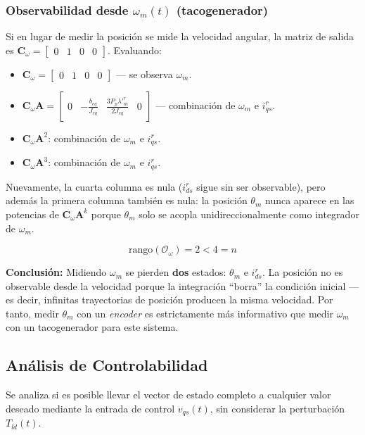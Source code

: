 \documentclass[12pt, a4paper,journal, onecolumn, compsoc]{IEEEtran}
\begin{document}
\subsubsection{Observabilidad desde \texorpdfstring{$\omega_m(t)$}{omega_m(t)} (tacogenerador)}
Si en lugar de medir la posición se mide la velocidad angular, la matriz de salida es $\mathbf{C}_\omega = \begin{bmatrix} 0 & 1 & 0 & 0 \end{bmatrix}$. Evaluando:
\begin{itemize}
    \item $\mathbf{C}_\omega = \begin{bmatrix} 0 & 1 & 0 & 0 \end{bmatrix}$ --- se observa $\omega_m$.
    \item $\mathbf{C}_\omega\mathbf{A} = \begin{bmatrix} 0 & -\frac{b_{eq}}{J_{eq}} & \frac{3P_p\lambda'^r_m}{2J_{eq}} & 0 \end{bmatrix}$ --- combinación de $\omega_m$ e $i_{qs}^r$.
    \item $\mathbf{C}_\omega\mathbf{A}^2$: combinación de $\omega_m$ e $i_{qs}^r$.
    \item $\mathbf{C}_\omega\mathbf{A}^3$: combinación de $\omega_m$ e $i_{qs}^r$.
\end{itemize}

Nuevamente, la cuarta columna es nula ($i_{ds}^r$ sigue sin ser observable), pero además la primera columna también es nula: la posición $\theta_m$ nunca aparece en las potencias de $\mathbf{C}_\omega\mathbf{A}^k$ porque $\theta_m$ solo se acopla unidireccionalmente como integrador de $\omega_m$.

\begin{equation}
    \text{rango}(\mathcal{O}_\omega) = 2 < 4 = n
\end{equation}

\textbf{Conclusión:} Midiendo $\omega_m$ se pierden \textbf{dos} estados: $\theta_m$ e $i_{ds}^r$. La posición no es observable desde la velocidad porque la integración ``borra'' la condición inicial ---es decir, infinitas trayectorias de posición producen la misma velocidad. Por tanto, medir $\theta_m$ con un \textit{encoder} es estrictamente más informativo que medir $\omega_m$ con un tacogenerador para este sistema.

\subsection{Análisis de Controlabilidad}
Se analiza si es posible llevar el vector de estado completo a cualquier valor deseado mediante la entrada de control $v_{qs}(t)$, sin considerar la perturbación $T_{ld}(t)$.
\end{document}
